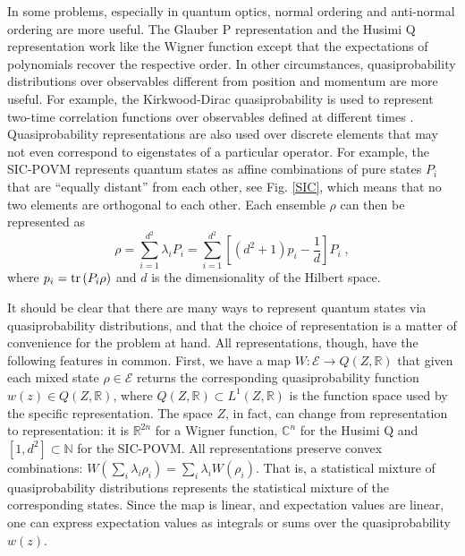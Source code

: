 \documentclass[10pt,twocolumn, nofootinbib]{revtex4-2}
\newcommand{\Ens}[1][E] {\mathcal{#1}} %
\begin{document}
In some problems, especially in quantum optics, normal ordering and anti-normal ordering are more useful. The Glauber P \cite{cahill1969} representation and the Husimi Q \cite{mandel1995,cahill1969} representation work like the Wigner function except that the expectations of polynomials recover the respective order. In other circumstances, quasiprobability distributions over observables different from position and momentum are more useful. For example, the Kirkwood-Dirac quasiprobability is used to represent two-time correlation functions over observables defined at different times \cite{lostaglio2023}. Quasiprobability representations are also used over discrete elements that may not even correspond to eigenstates of a particular operator. For example, the SIC-POVM \cite{fuchs2004} represents quantum states as affine combinations of pure states $P_i$ that are ``equally distant'' from each other, see Fig. \ref{SIC}, which means that no two elements are orthogonal to each other. Each ensemble $\rho$ can then be represented as
\begin{equation}
	\rho = \sum_{i=1}^{d^2} \lambda_i P_i = \sum_{i=1}^{d^2} \left[ (d^2 + 1) p_i - \frac{1}{d} \right] P_i \; ,
\end{equation}
where $p_i = \operatorname{tr} \left(P_i \rho\right)$ and $d$ is the dimensionality of the Hilbert space.

It should be clear that there are many ways to represent quantum states via quasiprobability distributions, and that the choice of representation is a matter of convenience for the problem at hand. All representations, though, have the following features in common. First, we have a map $W : \Ens \to Q(Z,\mathbb{R})$ that given each mixed state $\rho \in \Ens$ returns the corresponding quasiprobability function $w(z) \in Q(Z,\mathbb{R})$, where $Q(Z,\mathbb{R}) \subset L^1(Z,\mathbb{R})$ is the function space used by the specific representation. The space $Z$, in fact, can change from representation to representation: it is $\mathbb{R}^{2n}$ for a Wigner function, $\mathbb{C}^n$ for the Husimi Q and $[1, d^2] \subset \mathbb{N}$ for the SIC-POVM. All representations preserve convex combinations: $W(\sum_i \lambda_i \rho_i) = \sum_i \lambda_i W(\rho_i)$. That is, a statistical mixture of quasiprobability distributions represents the statistical mixture of the corresponding states. Since the map is linear, and expectation values are linear, one can express expectation values as integrals or sums over the quasiprobability $w(z)$. 
\end{document}

